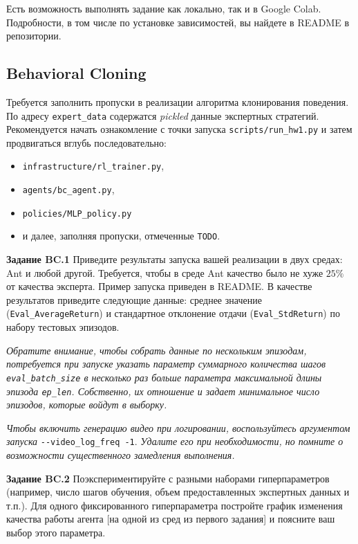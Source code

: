 \documentclass[12pt, oneside]{article}
\begin{document}
Есть возможность выполнять задание как локально, так и в Google Colab. Подробности, в том числе по установке зависимостей, вы найдете в README в репозитории.

\subsection{Behavioral Cloning}

Требуется заполнить пропуски в реализации алгоритма клонирования поведения. По адресу \verb|expert_data| содержатся \textit{pickled} данные экспертных стратегий. Рекомендуется начать ознакомление с точки запуска \verb|scripts/run_hw1.py| и затем продвигаться вглубь последовательно:

\begin{itemize}
    \item \verb|infrastructure/rl_trainer.py|,
    \item \verb|agents/bc_agent.py|,
    \item \verb|policies/MLP_policy.py|
    \item и далее, заполняя пропуски, отмеченные \verb|TODO|.
\end{itemize}

\textbf{Задание BC.1} Приведите результаты запуска вашей реализации в двух средах: Ant и любой другой. Требуется, чтобы в среде Ant качество было не хуже $25\%$ от качества эксперта. Пример запуска приведен в README. В качестве результатов приведите следующие данные: среднее значение (\verb|Eval_AverageReturn|) и стандартное отклонение отдачи (\verb|Eval_StdReturn|) по набору тестовых эпизодов.

\textit{Обратите внимание, чтобы собрать данные по нескольким эпизодам, потребуется при запуске указать параметр суммарного количества шагов \texttt{eval\_batch\_size} в несколько раз больше параметра максимальной длины эпизода \texttt{ep\_len}. Собственно, их отношение и задает минимальное число эпизодов, которые войдут в выборку.}

\textit{Чтобы включить генерацию видео при логировании, воспользуйтесь аргументом запуска} \verb|--video_log_freq -1|. \textit{Удалите его при необходимости, но помните о возможности существенного замедления выполнения.}

\textbf{Задание BC.2} Поэкспериментируйте с разными наборами гиперпараметров (например, число шагов обучения, объем предоставленных экспертных данных и т.п.). Для одного фиксированного гиперпараметра постройте график изменения качества работы агента [на одной из сред из первого задания] и поясните ваш выбор этого параметра.
\end{document}

